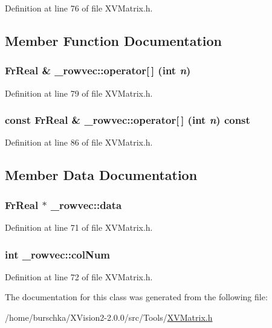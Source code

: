 Definition at line 76 of file XVMatrix.h.

\subsection{Member Function Documentation}
\label{_rowvec_a1}
\hypertarget{class__rowvec_a1}{
\subsubsection[operator{}]{\setlength{\rightskip}{0pt plus 5cm}Fr\-Real \& \_\-rowvec::operator\mbox{[}$\,$\mbox{]} (int {\em n})}}




Definition at line 79 of file XVMatrix.h.\label{_rowvec_a2}
\hypertarget{class__rowvec_a2}{
\subsubsection[operator{}]{\setlength{\rightskip}{0pt plus 5cm}const Fr\-Real \& \_\-rowvec::operator\mbox{[}$\,$\mbox{]} (int {\em n}) const}}




Definition at line 86 of file XVMatrix.h.

\subsection{Member Data Documentation}
\label{_rowvec_o0}
\hypertarget{class__rowvec_o0}{
\subsubsection[data]{\setlength{\rightskip}{0pt plus 5cm}Fr\-Real $\ast$ \_\-rowvec::data}}




Definition at line 71 of file XVMatrix.h.\label{_rowvec_o1}
\hypertarget{class__rowvec_o1}{
\subsubsection[colNum]{\setlength{\rightskip}{0pt plus 5cm}int \_\-rowvec::col\-Num}}




Definition at line 72 of file XVMatrix.h.

The documentation for this class was generated from the following file:\begin{CompactItemize}
\item 
/home/burschka/XVision2-2.0.0/src/Tools/\hyperlink{XVMatrix.h-source}{XVMatrix.h}\end{CompactItemize}
